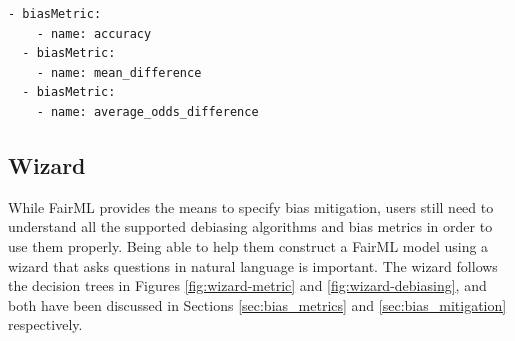 \documentclass[sigconf,review]{acmart}
\begin{document}
{\begin{lstlisting}[firstnumber=1,style=yaml,caption={Bias mitigation using  Demo Exponentiated Gradient Reduction  expressed in YAML.},label=lst:fairml_model]
  - biasMetric:
    - name: accuracy
  - biasMetric:
    - name: mean_difference
  - biasMetric:
    - name: average_odds_difference
\end{lstlisting}

%	
%	
%	
%	
%	

	\subsection{Wizard}
	\label{sec:wizard}
	While FairML provides the means to specify bias mitigation, users still need to understand all the supported debiasing algorithms and bias metrics in order to use them properly. Being able to help them construct a FairML model using a wizard that asks questions in natural language is important. The wizard follows the decision trees in Figures \ref{fig:wizard-metric} and \ref{fig:wizard-debiasing}, and both have been discussed in Sections \ref{sec:bias_metrics} and \ref{sec:bias_mitigation} respectively.

}
\end{document}
